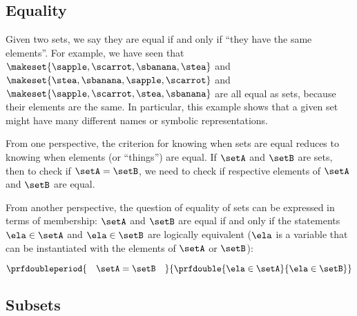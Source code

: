 \subsection{Equality}

Given two sets, we say they are equal if and only if ``they have the same elements''.
For example, we have seen that $\makeset{ \sapple, \scarrot, \sbanana, \stea }$ and~$\makeset{ \stea, \sbanana, \sapple, \scarrot}$ and~$\makeset{ \sapple, \scarrot, \stea, \sbanana }$ are all equal as sets, because their elements are the same.
In particular, this example shows that a given set might have many different names or symbolic representations.

From one perspective, the criterion for knowing when sets are equal reduces to knowing when elements (or ``things'') are equal.
If $\setA$ and $\setB$ are sets, then to check if $\setA = \setB$, we need to check if respective elements of $\setA$ and $\setB$ are equal.

From another perspective, the question of equality of sets can be expressed in terms of membership: $\setA$ and $\setB$ are equal if and only if the statements $\ela \in \setA$ and $\ela \in \setB$ are logically equivalent ($\ela$ is a variable that can be instantiated with the elements of $\setA$ or $\setB$):

\begin{equation*}
    \prfdoubleperiod{
        \quad \setA = \setB \quad
    }{
        \prfdouble{
            \ela \in \setA
        }{
            \ela \in \setB
        }
    }
\end{equation*}


\subsection{Subsets}

